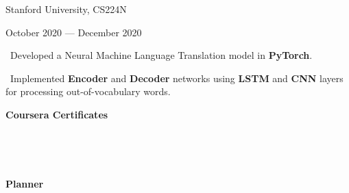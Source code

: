 \documentclass{article}
\begin{document}
\begin{minipage}[t][0pt]{8in\linewidth}
\begin{minipage}[t]{3.1in\linewidth\hspace{2.8em}}
\begin{minipage}[t]{3.3in\textwidth\hspace{0in}}
            \hspace{0.4em}\small\mdseries\textrm Stanford University, CS224N
            
            \hspace{0.4em}\small\mdseries\textrm October 2020 — December 2020
            
            \small\mdseries
            \vspace{0.4em}
            \hspace{1em}\textasteriskcentered \, \frenchspacing\mdseries\textrm{Developed a Neural Machine Language Translation model in \textbf{PyTorch}.}
            
            \vspace{0.4em}
            \hspace{1em}\textasteriskcentered \, \frenchspacing\mdseries\textrm{Implemented \textbf{Encoder} and \textbf{Decoder} networks using \textbf{LSTM} and \textbf{CNN} layers for processing out-of-vocabulary words.}
        \end{minipage}
    
        \begin{minipage}[t]{3.3in\textwidth\hspace{0in}}    
            \vspace{1.25em}        
            \mdseries\bfseries{Coursera Certificates}

            \small\mdseries
            \vspace{0.2em}
            \hspace{1em}\textasteriskcentered \, 
            
            \small\mdseries
            \vspace{0.2em}
            \hspace{1em}\textasteriskcentered \, 

            \small\mdseries
            \vspace{0.2em}
            \hspace{1em}\textasteriskcentered \hspace{-0.1em} 

        \end{minipage}

    \vspace{2em}
    \begin{minipage}[t]{3.25in\textwidth\hspace{-0.25em}}
        \mdseries\bfseries{Planner}            
        

\end{minipage}
\end{minipage}
\end{minipage}
\end{document}
